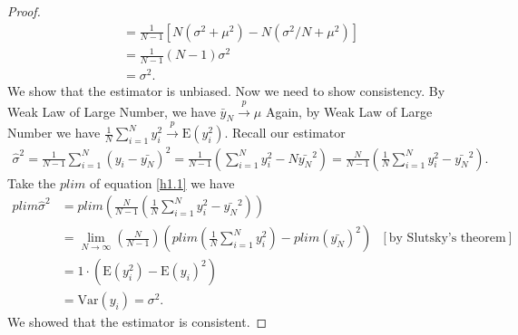\documentclass[10pt]{article}
\newcommand\convprob{\xrightarrow{p}}
\newcommand{\E}{\text{E}}
\newcommand{\V}{\text{Var}}
\begin{document}
\begin{enumerate}
\begin{proof}
\begin{align*}
    &=\frac{1}{N-1}[N(\sigma^2+\mu^2)-N(\sigma^2/N+\mu^2)]\\
    &=\frac{1}{N-1}(N-1)\sigma^2\\
    &=\sigma^2.
\end{align*}
We show that the estimator is unbiased. Now we need to show consistency. By Weak Law of Large Number, we have $\bar{y}_N\convprob\mu$ Again, by Weak Law of Large Number we have $\frac{1}{N}\sum_{i=1}^Ny_i^2\convprob \E(y_i^2).$ Recall our estimator
\begin{align}
    \hat{\sigma}^2=\frac{1}{N-1}\sum_{i=1}^N (y_i-\bar{y_N})^2=\frac{1}{N-1}\left(\sum_{i=1}^N y_i^2-N\bar{y_N}^2\right)=\frac{N}{N-1}\left(\frac{1}{N}\sum_{i=1}^N y_i^2-\bar{y_N}^2\right). \label{h1.1}
\end{align}
Take the $plim$ of equation \eqref{h1.1} we have
\begin{align*}
    plim \hat{\sigma}^2&=plim\left(\frac{N}{N-1}\left(\frac{1}{N}\sum_{i=1}^N y_i^2-\bar{y_N}^2\right)\right)\\
    &=\lim_{N\to\infty}\left(\frac{N}{N-1}\right)\left(plim\left(\frac{1}{N}\sum_{i=1}^N y_i^2\right)-plim(\bar{y_N})^2\right) \ \ \ [\text{by Slutsky's theorem}]\\
    &=1\cdot(\E(y_i^2)-\E(y_i)^2)\\
    &=\V(y_i)=\sigma^2.
\end{align*}
We showed that the estimator is consistent.
\end{proof}
\end{enumerate}
\end{document}
